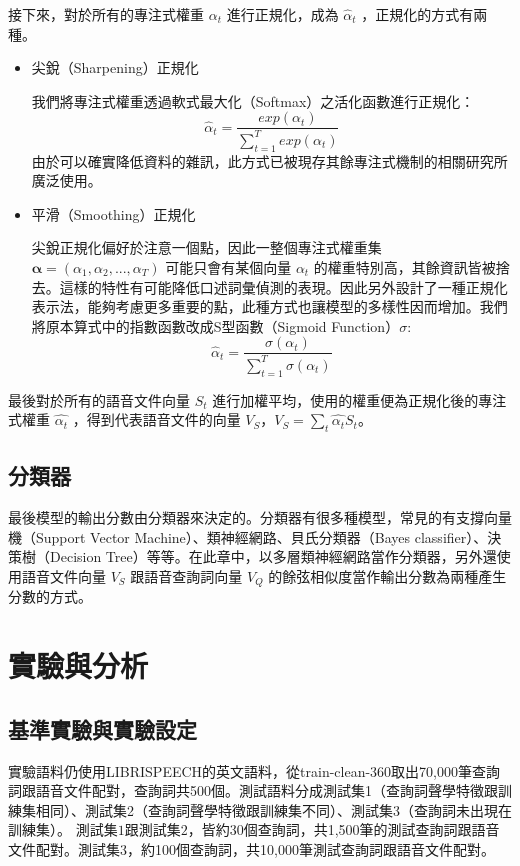 接下來，對於所有的專注式權重 $\alpha_t$ 進行正規化，成為
$\hat{\alpha}_t$ ，正規化的方式有兩種。
\begin{itemize}
	\item{尖銳（Sharpening）正規化}
		
		我們將專注式權重透過軟式最大化（Softmax）之活化函數進行正規化：
		\begin{equation}
			\hat{\alpha}_t =
			\frac{exp(\alpha_t)}{\sum_{t=1}^{T} exp(\alpha_t)}
		\end{equation}
		由於可以確實降低資料的雜訊，此方式已被現存其餘專注式機制的相關研究所廣泛使用。
	\item{平滑（Smoothing）正規化}
		
		尖銳正規化偏好於注意一個點，因此一整個專注式權重集 $
		\boldsymbol{\alpha}
		= (\alpha_1,\alpha_2, ...,
		\alpha_T)$
		可能只會有某個向量 $\alpha_t$ 的權重特別高，其餘資訊皆被捨去。這樣的特性有可能降低口述詞彙偵測的表現。因此另外設計了一種正規化表示法，能夠考慮更多重要的點，此種方式也讓模型的多樣性因而增加。我們將原本算式中的指數函數改成S型函數（Sigmoid Function）$\sigma$:
		\begin{equation}
			\hat{\alpha}_t =
			\frac{\sigma(\alpha_t)}{\sum_{t=1}^{T}\sigma(\alpha_t)}
		\end{equation}

\end{itemize}

最後對於所有的語音文件向量 $S_t$
進行加權平均，使用的權重便為正規化後的專注式權重 $\hat{\alpha_t}$
，得到代表語音文件的向量 $V_S$，$V_S
= \sum_{t} \hat{\alpha_t} S_t$。
\label{ch4_doc_vec}
\subsection{分類器}
最後模型的輸出分數由分類器來決定的。分類器有很多種模型，常見的有支撐向量機（Support
Vector Machine）、類神經網路、貝氏分類器（Bayes
classifier）、決策樹（Decision
Tree）等等。在此章中，以多層類神經網路當作分類器，另外還使用語音文件向量 $V_S$
跟語音查詢詞向量 $V_Q$ 的餘弦相似度當作輸出分數為兩種產生分數的方式。
\label{ch4_classify}
\section{實驗與分析}
\subsection{基準實驗與實驗設定}
實驗語料仍使用LIBRISPEECH的英文語料，從train-clean-360取出70,000筆查詢詞跟語音文件配對，查詢詞共500個。測試語料分成測試集1（查詢詞聲學特徵跟訓練集相同）、測試集2（查詢詞聲學特徵跟訓練集不同）、測試集3（查詢詞未出現在訓練集）。
測試集$1$跟測試集$2$，皆約30個查詢詞，共1,500筆的測試查詢詞跟語音文件配對。測試集$3$，約100個查詢詞，共10,000筆測試查詢詞跟語音文件配對。

